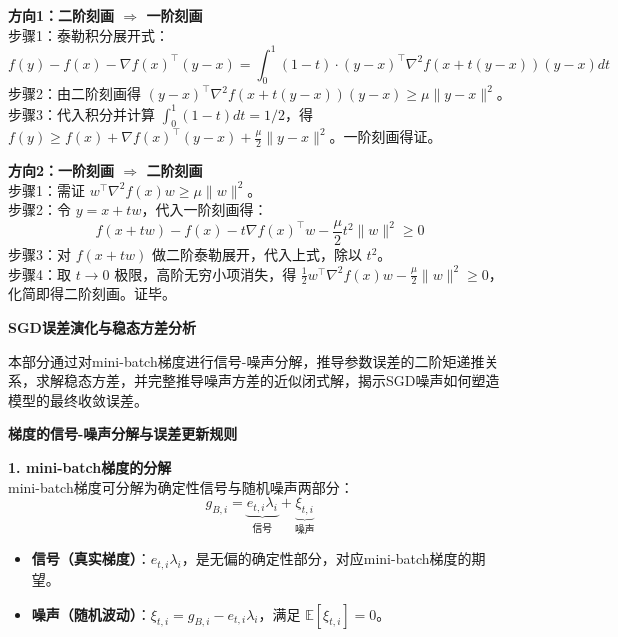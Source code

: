 \documentclass[10pt]{article}
\numberwithin{equation}{section}
\theoremstyle{plain}
\theoremstyle{definition}
\theoremstyle{remark}
\begin{document}
\begin{AnalysisBox}
\textbf{方向1：二阶刻画 $\Rightarrow$ 一阶刻画}\\
步骤1：泰勒积分展开式：
\[ \displaystyle f(y) - f(x) - \nabla f(x)^\top (y-x) = \int_0^1 (1-t) \cdot (y-x)^\top \nabla^2 f\left(x+t(y-x)\right) (y-x) dt \]
步骤2：由二阶刻画得 $(y-x)^\top \nabla^2 f\left(x+t(y-x)\right) (y-x) \ge \mu \|y-x\|^2$。\\
步骤3：代入积分并计算 $\int_0^1 (1-t) dt = 1/2$，得 $\displaystyle f(y) \ge f(x) + \nabla f(x)^\top (y-x) + \frac{\mu}{2}\|y-x\|^2$。一阶刻画得证。

\textbf{方向2：一阶刻画 $\Rightarrow$ 二阶刻画}\\
步骤1：需证 $w^\top \nabla^2 f(x) w \ge \mu \|w\|^2$。\\
步骤2：令 $y = x + tw$，代入一阶刻画得：
\[ \displaystyle f(x+tw) - f(x) - t \nabla f(x)^\top w - \frac{\mu}{2} t^2 \|w\|^2 \ge 0 \]
步骤3：对 $f(x+tw)$ 做二阶泰勒展开，代入上式，除以 $t^2$。\\
步骤4：取 $t \to 0$ 极限，高阶无穷小项消失，得 $\displaystyle \frac{1}{2} w^\top \nabla^2 f(x) w - \frac{\mu}{2} \|w\|^2 \ge 0$，化简即得二阶刻画。证毕。
\end{AnalysisBox}

{\par\vspace{1ex}\noindent\large\bfseries\color{brandD} SGD误差演化与稳态方差分析\par}\par\vspace{0.5ex}
本部分通过对mini-batch梯度进行信号-噪声分解，推导参数误差的二阶矩递推关系，求解稳态方差，并完整推导噪声方差的近似闭式解，揭示SGD噪声如何塑造模型的最终收敛误差。

{\par\vspace{0.8ex}\noindent\normalsize\bfseries\color{secblue} 梯度的信号-噪声分解与误差更新规则\par}
\textbf{1. mini-batch梯度的分解}\\
mini-batch梯度可分解为确定性信号与随机噪声两部分：
\[ \displaystyle g_{B,i} = \underbrace{e_{t,i}\lambda_i}_{\text{信号}} + \underbrace{\xi_{t,i}}_{\text{噪声}} \tag{51} \]
\begin{itemize}[leftmargin=*,nosep]
    \item \textbf{信号（真实梯度）}：$e_{t,i}\lambda_i$，是无偏的确定性部分，对应mini-batch梯度的期望。
    \item \textbf{噪声（随机波动）}：$\xi_{t,i} = g_{B,i} - e_{t,i}\lambda_i$，满足 $\mathbb{E}[\xi_{t,i}] = 0$。
\end{itemize}
\end{document}
